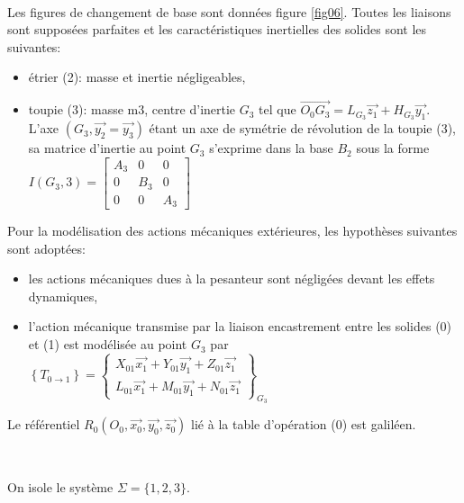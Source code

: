 ~\

Les figures de changement de base sont données figure \ref{fig06}. Toutes les liaisons sont supposées parfaites et les caractéristiques inertielles des solides sont les suivantes:
\begin{itemize}
 \item étrier (2): masse et inertie négligeables,
 \item toupie (3): masse m3, centre d'inertie $G_3$ tel que $\overrightarrow{O_0G_3}=L_{G_3}\overrightarrow{z_1}+H_{G_3}\overrightarrow{y_1}$. L'axe $(G_3,\overrightarrow{y_2}=\overrightarrow{y_3})$ étant un axe de symétrie de révolution de la toupie (3), sa matrice d'inertie au point $G_3$ s'exprime dans la base $B_2$ sous la forme $I(G_3,3)=\left[\begin{array}{ccc} 
         A_3&0&0 \\ 0&B_3&0 \\ 0&0&A_3 
   \end{array}\right]$
\end{itemize}

\newpage

Pour la modélisation des actions mécaniques extérieures, les hypothèses suivantes sont adoptées:
\begin{itemize}
 \item les actions mécaniques dues à la pesanteur sont négligées devant les effets dynamiques,
 \item l'action mécanique transmise par la liaison encastrement entre les solides (0) et (1) est modélisée au point $G_3$ par
$\left \{T_{0 \rightarrow 1}\right \}=\left \{
\begin{matrix}
 X_{01}\overrightarrow{x_1}+Y_{01}\overrightarrow{y_1}+Z_{01}\overrightarrow{z_1} \\ 
 L_{01}\overrightarrow{x_1}+M_{01}\overrightarrow{y_1}+N_{01}\overrightarrow{z_1}
\end{matrix}
\right \}_{G_3}
$
\end{itemize}

Le référentiel $R_0(O_0,\overrightarrow{x_0},\overrightarrow{y_0},\overrightarrow{z_0})$ lié à la table d'opération (0) est galiléen.


~\

On isole le système $\Sigma=\{1,2,3 \}$.


